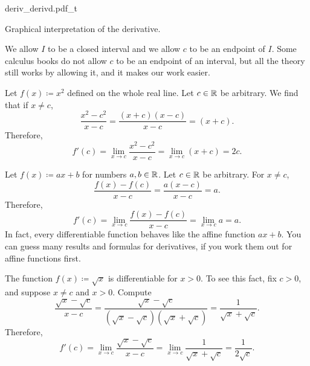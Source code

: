 \begin{myfigureht}
{deriv_derivd.pdf_t}
\caption{Graphical interpretation of the derivative.\label{derivfig}}
\end{myfigureht}

We allow $I$ to be a closed interval and we allow
$c$ to be an endpoint of $I$.  Some calculus books do not allow $c$ to be an
endpoint of an interval, but all the theory still works by allowing it, and
it makes our work easier.

\begin{example}
Let $f(x) \coloneqq x^2$ defined on the whole real line.  Let $c \in {\mathbb{R}}$ be arbitrary.  We find that if
$x \not=c$,
\begin{equation*}
\frac{x^2-c^2}{x-c} =
\frac{(x+c)(x-c)}{x-c} =
(x+c) .
\end{equation*}
Therefore,
\begin{equation*}
f'(c) = 
\lim_{x\to c} \frac{x^2-c^2}{x-c} =
\lim_{x\to c} (x+c) = 2c.
\end{equation*}
\end{example}

\begin{example}
Let $f(x) \coloneqq ax + b$ for numbers $a, b \in {\mathbb{R}}$.
Let $c \in {\mathbb{R}}$ be arbitrary.
For $x \not=c$,
\begin{equation*}
\frac{f(x)-f(c)}{x-c} =
\frac{a(x-c)}{x-c} = a .
\end{equation*}
Therefore,
\begin{equation*}
f'(c) =
\lim_{x\to c} 
\frac{f(x)-f(c)}{x-c} =
\lim_{x\to c} 
a = a.
\end{equation*}
In fact, every differentiable function  behaves like
the affine function $ax + b$.  You can guess many results
and formulas for derivatives, if you work them out for affine functions
first.
\end{example}

\begin{example}
The function $f(x) \coloneqq \sqrt{x}$ is differentiable for $x > 0$.  To see this
fact, fix $c > 0$,
and suppose $x \not= c$ and $x > 0$.  Compute
\begin{equation*}
\frac{\sqrt{x}-\sqrt{c}}{x-c}
=
\frac{\sqrt{x}-\sqrt{c}}{(\sqrt{x}-\sqrt{c})(\sqrt{x}+\sqrt{c})}
=
\frac{1}{\sqrt{x}+\sqrt{c}} .
\end{equation*}
Therefore,
\begin{equation*}
f'(c) =
\lim_{x\to c}
\frac{\sqrt{x}-\sqrt{c}}{x-c}
=
\lim_{x\to c}
\frac{1}{\sqrt{x}+\sqrt{c}}
=
\frac{1}{2\sqrt{c}} .
\end{equation*}
\end{example}


